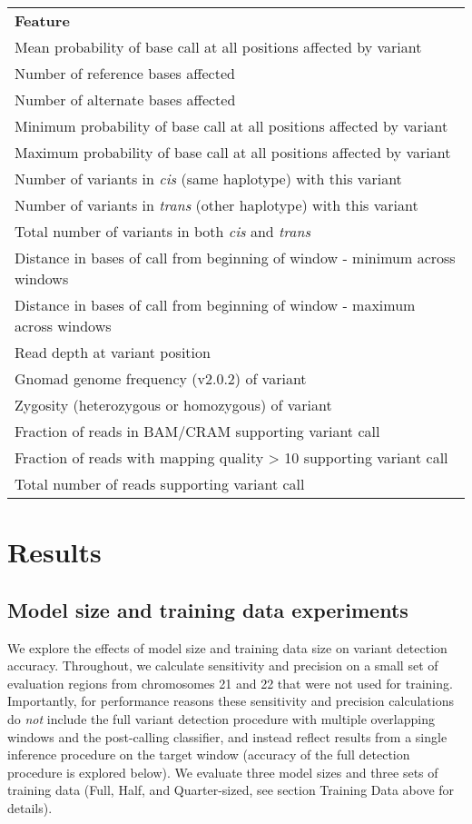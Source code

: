\documentclass[]{article}
\begin{document}
\begin{center}
	\begin{tabular}{ l }
	 \textbf{Feature} \\
	 Mean probability of base call at all positions affected by variant \\ 
	 Number of reference bases affected \\
	 Number of alternate bases affected \\
	 Minimum probability of base call at all positions affected by variant \\
	 Maximum probability of base call at all positions affected by variant \\
	 Number of variants in \textit{cis} (same haplotype) with this variant \\
	 Number of variants in \textit{trans} (other haplotype) with this variant \\ 
	 Total number of variants in both \textit{cis} and \textit{trans} \\
	 Distance in bases of call from beginning of window - minimum across windows \\
	 Distance in bases of call from beginning of window - maximum across windows \\
	 Read depth at variant position \\
	 Gnomad genome frequency (v2.0.2) of variant \\
	 Zygosity (heterozygous or homozygous) of variant \\
	 Fraction of reads in BAM/CRAM supporting variant call \\
	 Fraction of reads with mapping quality > 10 supporting variant call \\
	 Total number of reads supporting variant call \\
	\end{tabular}
	\label{table:features}
\end{center}

\section{Results}

\subsection{Model size and training data experiments}

We explore the effects of model size and training data size on variant detection accuracy. Throughout, we calculate sensitivity and precision on a small set of evaluation regions from chromosomes 21 and 22 that were not used for training. Importantly, for performance reasons these sensitivity and precision calculations do \textit{not} include the full variant detection procedure with multiple overlapping windows and the post-calling classifier, and instead reflect results from a single inference procedure on the target window (accuracy of the full detection procedure is explored below).  We evaluate three model sizes and three sets of training data (Full, Half, and Quarter-sized, see section Training Data above for details).
\end{document}
